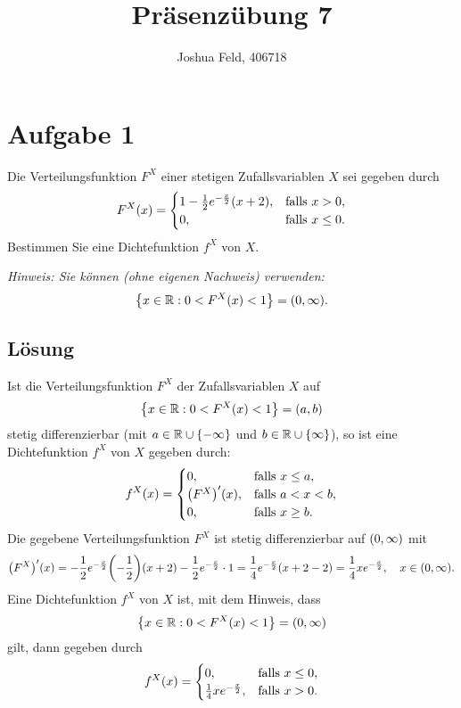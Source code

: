 \documentclass{exercise}
\institute{Institut für Statistik und Wirtschaftsmathematik}
\title{Präsenzübung 7}
\author{Joshua Feld, 406718}
\begin{document}
    \maketitle


    \section*{Aufgabe 1}
    
    \begin{problem}
        Die Verteilungsfunktion \(F^X\) einer stetigen Zufallsvariablen \(X\) sei gegeben durch
        \[
            F^X\parentheses*{x} = \begin{cases}
                1 - \frac{1}{2}e^{-\frac{x}{2}}\parentheses*{x + 2}, & \text{falls }x > 0,\\
                0, & \text{falls }x \le 0.
            \end{cases}
        \]
        Bestimmen Sie eine Dichtefunktion \(f^X\) von \(X\).

        \emph{Hinweis: Sie können (ohne eigenen Nachweis) verwenden:
        \[
            \braces*{x \in \R : 0 < F^X\parentheses*{x} < 1} = \parentheses*{0, \infty}.
        \]}
    \end{problem}
    
    \subsection*{Lösung}
    Ist die Verteilungsfunktion \(F^X\) der Zufallsvariablen \(X\) auf
    \[
        \braces*{x \in \R : 0 < F^X\parentheses*{x} < 1} = \parentheses*{a, b}
    \]
    stetig differenzierbar (mit \(a \in \R \cup \braces*{-\infty}\) und \(b \in \R \cup \braces*{\infty}\)), so ist eine Dichtefunktion \(f^X\) von \(X\) gegeben durch:
    \[
        f^X\parentheses*{x} = \begin{cases}
            0, & \text{falls }x \le a,\\
            \parentheses*{F^X}'\parentheses*{x}, & \text{falls }a < x < b,\\
            0, & \text{falls }x \ge b.
        \end{cases}
    \]
    Die gegebene Verteilungsfunktion \(F^X\) ist stetig differenzierbar auf \(\parentheses*{0, \infty}\) mit
    \[
        \parentheses*{F^X}'\parentheses*{x} = -\frac{1}{2}e^{-\frac{x}{2}}\parentheses*{-\frac{1}{2}}\parentheses*{x + 2} - \frac{1}{2}e^{-\frac{x}{2}} \cdot 1 = \frac{1}{4}e^{-\frac{x}{2}}\parentheses*{x + 2 - 2} = \frac{1}{4}xe^{-\frac{x}{2}}, \quad x \in \parentheses*{0, \infty}.
    \]
    Eine Dichtefunktion \(f^X\) von \(X\) ist, mit dem Hinweis, dass
    \[
        \braces*{x \in \R : 0 < F^X\parentheses*{x} < 1} = \parentheses*{0, \infty}
    \]
    gilt, dann gegeben durch
    \[
        f^X\parentheses*{x} = \begin{cases}
            0, & \text{falls }x \le 0,\\
            \frac{1}{4}xe^{-\frac{x}{2}}, & \text{falls }x > 0.
        \end{cases}
    \]
\end{document}
